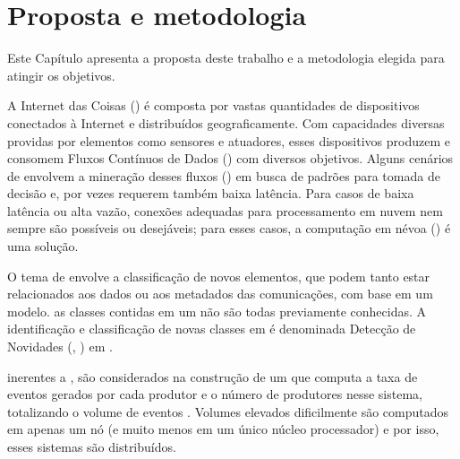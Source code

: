 \chapter{Proposta e metodologia}\label{cha:proposta}

\begin{resumocap}

  Este Capítulo apresenta a proposta deste trabalho e a metodologia elegida para
  atingir os objetivos.

\end{resumocap}


A Internet das Coisas (\iot) é composta por vastas quantidades de dispositivos
conectados à Internet e distribuídos geograficamente.
Com capacidades diversas providas por elementos como sensores e atuadores, esses
dispositivos produzem e consomem Fluxos Contínuos de Dados (\streams) com
diversos objetivos.
Alguns cenários de \iot envolvem a mineração desses fluxos (\streamMining) em busca de
padrões para tomada de decisão e, por vezes requerem também baixa latência.
Para casos de baixa latência ou alta vazão, conexões adequadas para
processamento em nuvem nem sempre são possíveis ou desejáveis; para esses casos,
a computação em névoa (\fog) é uma solução.

O tema de \streamMining envolve a classificação de novos elementos,
que podem tanto estar relacionados aos dados ou aos metadados das comunicações,
com base em um modelo.
as classes contidas em um \stream não são todas previamente conhecidas.
A identificação e classificação de novas classes em \streams é denominada
Detecção de Novidades (\novelty, \nd) em \streams.

inerentes a \streamMining, são considerados na construção de um
que computa \streams a taxa de eventos
gerados por cada produtor e o número de produtores nesse sistema, totalizando o
volume de eventos 
.
Volumes elevados dificilmente são computados em apenas um nó (e muito menos em
um único núcleo processador) e por isso, esses sistemas  são distribuídos.

